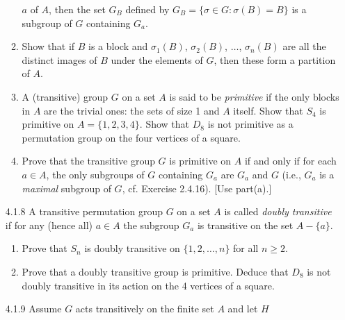 \begin{enumerate}
\begin{enumerate}
                           $a$ of $A$, then the set $G_B$ defined by
                           $G_B = \{\sigma \in G : \sigma(B) = B\}$ is a
                           subgroup of $G$ containing $G_a$.
                     \item Show that if $B$ is a block and $\sigma_1(B)$,
                           $\sigma_2(B)$, $\ldots$, $\sigma_n(B)$ are all the
                           distinct images of $B$ under the elements of $G$,
                           then these form a partition of $A$.
                     \item A (transitive) group $G$ on a set $A$ is said to be
                           \textit{primitive} if the only blocks in $A$ are the
                           trivial ones: the sets of size 1 and $A$ itself. Show
                           that $S_4$ is primitive on $A = \{1, 2, 3, 4\}$. Show
                           that $D_8$ is not primitive as a permutation group on
                           the four vertices of a square.
                     \item Prove that the transitive group $G$ is primitive on
                           $A$ if and only if for each $a \in A$, the only
                           subgroups of $G$ containing $G_a$ are $G_a$ and $G$
                           (i.e., $G_a$ is a \textit{maximal} subgroup of $G$,
                           cf. Exercise 2.4.16). [Use part(a).]
                  \end{enumerate}
   \item[4.1.8]   A transitive permutation group $G$ on a set $A$ is called
                  \textit{doubly transitive} if for any (hence all) $a \in A$
                  the subgroup $G_a$ is transitive on the set $A - \{a\}$.
                  \begin{enumerate}
                     \item Prove that $S_n$ is doubly transitive on
                           $\{1, 2, \ldots, n\}$ for all $n \ge 2$.
                     \item Prove that a doubly transitive group is primitive.
                           Deduce that $D_8$ is not doubly transitive in its
                           action on the 4 vertices of a square.
                  \end{enumerate}
   \item[4.1.9]   Assume $G$ acts transitively on the finite set $A$ and let $H$

\end{enumerate}
